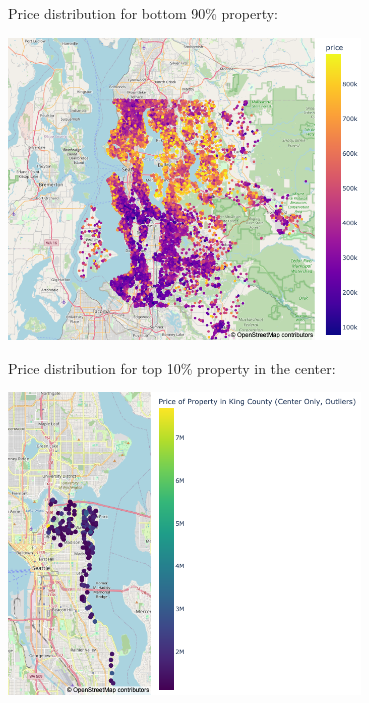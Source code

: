 \documentclass{beamer}
\begin{document}
\begin{frame}{}

Price distribution for bottom 90\% property: 

\begin{center}
\includegraphics[width=0.7\textwidth]{all_houses_mapbox_clean.png} 
\end{center}

\end{frame}

\begin{frame}{}

Price distribution for top 10\% property in the center: 

\begin{center}
\includegraphics[width=0.7\textwidth]{mapbox_center_outliers.png} 
\end{center}

\end{frame}
\end{document}

